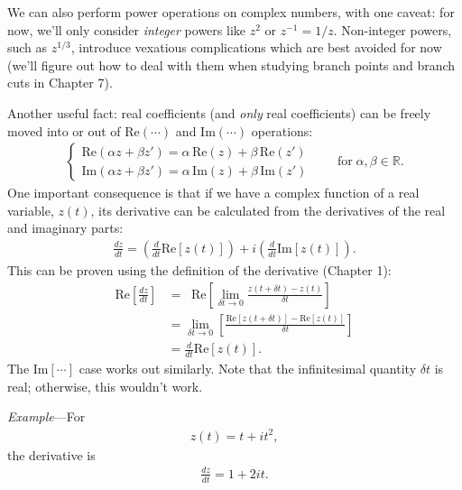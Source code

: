 \documentclass[10pt,a4paper]{article}
\begin{document}
We can also perform power operations on complex numbers, with one
caveat: for now, we'll only consider \textit{integer} powers like
$z^2$ or $z^{-1} = 1/z$.  Non-integer powers, such as $z^{1/3}$,
introduce vexatious complications which are best avoided for now
(we'll figure out how to deal with them when studying branch points
and branch cuts in Chapter 7).

Another useful fact: real coefficients (and \textit{only} real
coefficients) can be freely moved into or out of $\textrm{Re}(\cdots)$
and $\textrm{Im}(\cdots)$ operations:
\begin{align}
  \left\{\begin{array}{l}\mathrm{Re}(\alpha z + \beta z') = \alpha \, \mathrm{Re}(z) + \beta\, \mathrm{Re}(z')\\ \mathrm{Im}(\alpha z + \beta z') = \alpha \, \mathrm{Im}(z) + \beta\, \mathrm{Im}(z')\end{array}\right.\qquad\mathrm{for}\;\alpha, \beta \in \mathbb{R}.
\end{align}
One important consequence is that if we have a complex function of a
real variable, $z(t)$, its derivative can be calculated from the
derivatives of the real and imaginary parts:
\begin{align}
  \frac{dz}{dt} = \left(\frac{d}{dt} \mathrm{Re}\left[z(t)\right] \right) + i \left(\frac{d}{dt} \mathrm{Im}\left[z(t)\right]\right).
\end{align}
This can be proven using the definition of the derivative (Chapter 1):
\begin{align}
  \mathrm{Re}\left[\frac{dz}{dt}\right] &= \;\; \mathrm{Re}\left[\lim_{\delta t \rightarrow 0} \frac{z(t+\delta t) - z(t)}{\delta t}\right] \\
    &= \lim_{\delta t \rightarrow 0} \left[\frac{\mathrm{Re}[z(t+\delta t)] - \mathrm{Re}[z(t)]}{\delta t}\right] \\
    &= \frac{d}{dt} \mathrm{Re}\left[z(t)\right].
\end{align}
The $\mathrm{Im}[\cdots]$ case works out similarly.  Note that the
infinitesimal quantity $\delta t$ is real; otherwise, this wouldn't
work.

\begin{framed}\noindent
  \textit{Example}---For
  \begin{align}
    z(t) = t + it^2,
  \end{align}
  the derivative is
  \begin{align}
    \frac{dz}{dt} = 1 + 2it.
  \end{align}
\end{framed}
\end{document}
